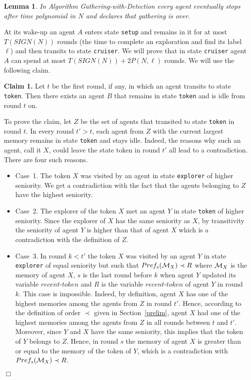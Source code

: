 \documentclass[11pt]{article}
\newtheorem{lemma}{Lemma}[section]
\newcommand{\qed}{\hfill $\Box$ \bigbreak}
\newenvironment{proof}{\noindent {\bf Proof.}}{\qed}
\newcommand{\cM}{{\cal M}}
\begin{document}
\begin{lemma}\label{term}
In Algorithm Gathering-with-Detection every agent eventually stops after time polynomial in $N$ and declares that gathering is over.
\end{lemma}

\begin{proof}
At its wake-up an agent $A$ enters state  {\tt setup} and remains in it for at most {$T(SIGN(N))$ rounds} (the time to complete an exploration and find
its label $\ell$) and then transits to state {\tt cruiser}. We will prove that
in state {\tt cruiser} agent $A$ can spend at most  {$T(SIGN(N))+2P(N,\ell)$ rounds}.
We will use the following claim.

\vspace*{0.3cm}
\noindent
{\bf Claim 1.} Let $t$ be the first round{, if any,} in which an agent transits to state {\tt token}. Then there exists an agent $B$ that remains in state {\tt token}
and is idle from round $t$ on.

{To prove the claim, let $Z$ be the set of agents that transited to state {\tt token} in round $t$.  In every round $t'>t$, {each} agent from $Z$ with the current largest memory
remains in state {\tt token} and stays idle. Indeed, the reasons why such an agent, call it $X$, could leave the state token in round $t'$ all lead to a contradiction. There are four such reasons.}

\begin{itemize}
\item{ {Case~1.} The token $X$ was visited by an agent in state {\tt explorer} of higher seniority. We get a contradiction with the fact that the agents belonging to $Z$ have the highest seniority.}

\item{ {Case~2.} The explorer of the token $X$ met an agent $Y$ in state {\tt token} of higher seniority. Since the explorer of $X$ has the same seniority as $X$, by transitivity the seniority of agent $Y$ is higher than that of agent $X$ which is a contradiction with the definition of $Z$.}

\item{ {Case~3.} In round $k< t'$ the token $X$ was visited by an agent $Y$ in state {\tt explorer} of equal seniority but such that $Pref_s(\cM_X) \prec R$ where $\cM_X$ is the memory of agent $X$, $s$ is the last round before $k$ when agent $Y$ updated its variable $recent$-$token$ and $R$ is the variable $recent$-$token$ of agent $Y$ in round $k$. This case is impossible. Indeed, by definition, agent $X$ has one of the highest memories among the agents from $Z$ in round $t'$. Hence, according to the definition of order $\prec$ given in Section~\ref{prelim}, agent $X$ had one of the highest memories among the agents from $Z$ in all rounds between $t$ and $t'$. Moreover, since $Y$ and $X$ have the same seniority, this implies that the token of $Y$ belongs to $Z$. Hence, in round $s$ the memory of agent $X$ is greater than or equal to the memory of the token of $Y$, which is a contradiction with $Pref_s(\cM_X) \prec R$.}



\end{itemize}
\end{proof}
\end{document}
